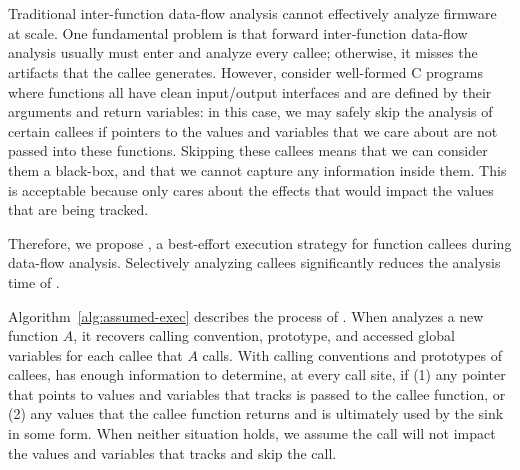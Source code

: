\section{\assumed}
\label{sec:assumed_execution}

Traditional inter-function data-flow analysis cannot effectively analyze firmware at scale.
One fundamental problem is that forward inter-function data-flow analysis usually must enter and analyze every callee; otherwise, it misses the artifacts that the callee generates.
However, consider well-formed C programs where functions all have clean input/output interfaces and are defined by their arguments and return variables: in this case, we may safely skip the analysis of certain callees if pointers to the values and variables that we care about are not passed into these functions.
Skipping these callees means that we can consider them a black-box, and that we cannot capture any information inside them.
This is acceptable because \rda only cares about the effects that would impact the values that are being tracked.

Therefore, we propose \emph{\assumed}, a best-effort execution strategy for function callees during data-flow analysis.
Selectively analyzing callees significantly reduces the analysis time of \rda.



Algorithm~\ref{alg:assumed-exec} describes the process of \assumed.
When \rda analyzes a new function $A$, it recovers calling convention, prototype, and accessed global variables for each callee that $A$ calls.
With calling conventions and prototypes of callees, \rda has enough information to determine, at every call site, if (1) any pointer that points to values and variables that \rda tracks is passed to the callee function, or (2) any values that the callee function returns and is ultimately used by the sink in some form.
When neither situation holds, we assume the call will not impact the values and variables that \rda tracks and skip the call.

